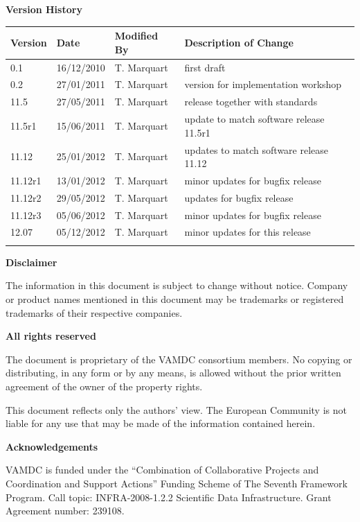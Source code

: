 {\begin{titlepage}
\end{titlepage}

\noindent \textbf{Version History}

\textbf{}

\noindent \begin{tabular}{|l|l|l|l|} 
\hline 
\textbf{Version} & \textbf{Date} & \textbf{Modified By} & \textbf{Description of Change} \\ \hline 
0.1 & 16/12/2010 & T. Marquart & first draft \\ \hline 
0.2 & 27/01/2011 & T. Marquart & version for implementation workshop \\ \hline 
11.5 & 27/05/2011 & T. Marquart & release together with standards \\ \hline 
11.5r1 & 15/06/2011 & T. Marquart & update to match software release 11.5r1 \\ \hline 
11.12 & 25/01/2012 & T. Marquart & updates to match software release 11.12 \\ \hline 
11.12r1 & 13/01/2012 & T. Marquart & minor updates for bugfix release \\ \hline 
11.12r2 & 29/05/2012 & T. Marquart & updates for bugfix release \\ \hline 
11.12r3 & 05/06/2012 & T. Marquart & minor updates for bugfix release \\ \hline 
12.07 & 05/12/2012 & T. Marquart & minor updates for this release \\ \hline 
 &  &  &  \\ \hline 
\end{tabular}

\textbf{}

\noindent \textbf{Disclaimer}

\noindent The information in this document is subject to change without notice. Company or product names mentioned in this document may be trademarks or registered trademarks of their respective companies.


\textbf{}

\noindent \textbf{All rights reserved}

\noindent The document is proprietary of the VAMDC consortium members. No copying or distributing, in any form or by any means, is allowed without the prior written agreement of the owner of the property rights.

\noindent 

\noindent This document reflects only the authors' view. The European Community is not liable for any use that may be made of the information contained herein.

\textbf{}

\noindent \textbf{Acknowledgements}

\noindent VAMDC is funded under the ``Combination of Collaborative Projects and Coordination and  Support Actions'' Funding Scheme of The Seventh Framework Program. Call topic: INFRA-2008-1.2.2 Scientific Data Infrastructure. Grant Agreement number: 239108.

\textbf{}

}
